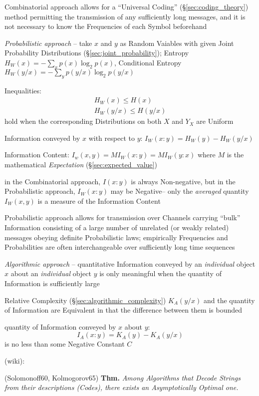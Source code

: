 Combinatorial approach allows for a ``Universal Coding''
(\S\ref{sec:coding_theory}) method permitting the transmission of any
sufficiently long messages, and it is not necessary to know the Frequencies of
each Symbol beforehand

\emph{Probabilistic approach} -- take $x$ and $y$ as Random Vaiables with given
Joint Probability Distributions (\S\ref{sec:joint_probability}); Entropy
$H_W(x) = -\sum_x p(x) \log_2 p(x)$, Conditional Entropy
$H_W(y/x) = -\sum_y p(y/x) \log_2 p(y/x)$

Inequalities:
\begin{align*}
  H_W(x) \leq H(x) \\
  H_W(y/x) \leq H(y/x)
\end{align*}
hold when the corresponding Distributions on both $X$ and $Y_X$ are Uniform

Information conveyed by $x$ with respect to $y$: $I_W(x:y) = H_W(y) - H_W(y/x)$

Information Content: $I_w(x,y) = MI_W(x : y) = MI_W(y : x)$ where $M$ is the
mathematical \emph{Expectation} (\S\ref{sec:expected_value})

in the Combinatorial approach, $I(x:y)$ is always Non-negative, but in the
Probabilistic approach, $I_W(x:y)$ may be Negative-- only the \emph{averaged}
quantity $I_W(x,y)$ is a measure of the Information Content

Probabilistic approach allows for transmission over Channels carrying ``bulk''
Information consisting of a large number of unrelated (or weakly related)
messages obeying definite Probabilistic laws; empirically Frequencies and
Probabilities are often interchangeable over sufficiently long time sequences

\emph{Algorithmic approach} -- quantitative Information conveyed by an
\emph{individual} object $x$ about an \emph{individual} object $y$ is only
meaningful when the quantity of Information is sufficiently large

Relative Complexity (\S\ref{sec:algorithmic_complexity}) $K_A(y/x)$ and the
quantity of Information are Equivalent in that the difference between them is
bounded

quantity of Information conveyed by $x$ about $y$:
\[
  I_A(x:y) = K_A(y) - K_A(y/x)
\]
is no less than some Negative Constant $C$

(wiki):

(Solomonoff60, Kolmogorov65) \textbf{Thm.}
\emph{Among Algorithms that Decode Strings from their descriptions (Codes),
  there exists an Asymptotically Optimal one.}

